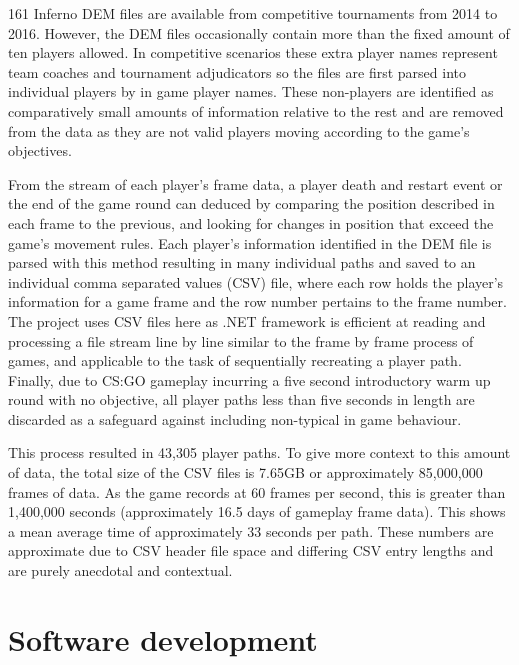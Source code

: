 \documentclass[journal]{IEEEtran}
\begin{document}
161 Inferno DEM files are available from competitive tournaments from 2014 to 2016. However, the DEM files occasionally contain more than the fixed amount of ten players allowed. In competitive scenarios these extra player names represent team coaches and tournament adjudicators so the files are first parsed into individual players by in game player names. These non-players are identified as comparatively small amounts of information relative to the rest and are removed from the data as they are not valid players moving according to the game's objectives.

From the stream of each player's frame data, a player death and restart event or the end of the game round can deduced by comparing the position described in each frame to the previous, and looking for changes in position that exceed the game's movement rules. Each player's information identified in the DEM file is parsed with this method resulting in many individual paths and saved to an individual comma separated values (CSV) file, where each row holds the player's information for a game frame and the row number pertains to the frame number. The project uses CSV files here as .NET framework is efficient at reading and processing a file stream line by line similar to the frame by frame process of games, and applicable to the task of sequentially recreating a player path. Finally, due to CS:GO gameplay incurring a five second introductory warm up round with no objective, all player paths less than five seconds in length are discarded as a safeguard against including non-typical in game behaviour.

This process resulted in 43,305 player paths. To give more context to this amount of data, the total size of the CSV files is 7.65GB or approximately 85,000,000 frames of data. As the game records at 60 frames per second, this is greater than 1,400,000 seconds (approximately 16.5 days of gameplay frame data). This shows a mean average time of approximately 33 seconds per path. These numbers are approximate due to CSV header file space and differing CSV entry lengths and are purely anecdotal and contextual.

\section{Software development}
\end{document}
